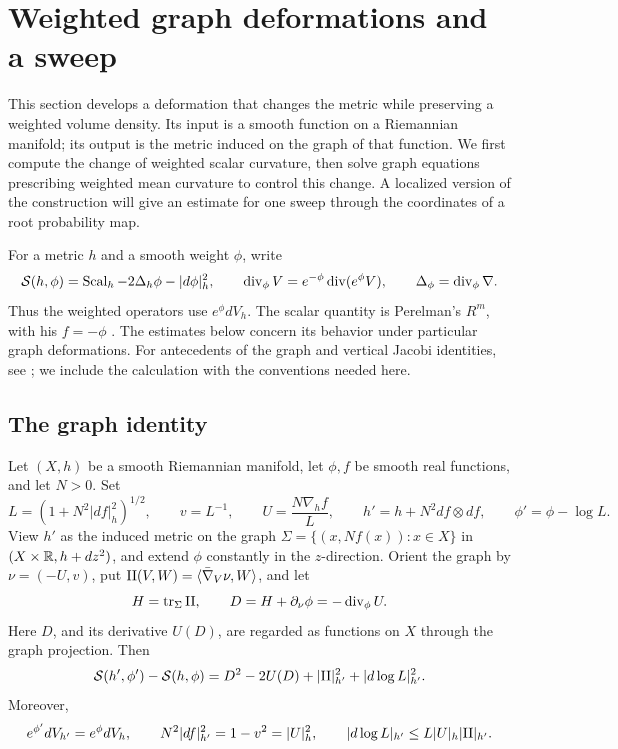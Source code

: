 \section{Weighted graph deformations and a sweep}
\label{sec:graphs}

This section develops a deformation that changes the metric while
preserving a weighted volume density.  Its input is a smooth function
on a Riemannian manifold; its output is the metric induced on the
graph of that function.  We first compute the change of weighted
scalar curvature, then solve graph equations prescribing weighted mean
curvature to control this change.  A localized version of the construction will give an
estimate for one sweep through the coordinates of a root probability
map.

For a metric \(h\) and a smooth weight \(\phi\), write
\[
 \mathcal S(h,\phi)=\operatorname{Scal}_h-2\Delta_h\phi-|d\phi|_h^2,
 \qquad
 \operatorname{div}_\phi V=e^{-\phi}\operatorname{div}(e^\phi V),
 \qquad
 \Delta_\phi=\operatorname{div}_\phi\nabla .
\]
Thus the weighted operators use \(e^\phi dV_h\).  The scalar quantity
is Perelman's \(R^m\), with his \(f=-\phi\)
\cite[Section~1.3]{Perelman2002}.  The estimates below concern its
behavior under particular graph deformations.  For antecedents of
the graph and vertical Jacobi identities, see
\cite[Proposition~4.1]{OpenAIScalarInessentiality2026}; we include the
calculation with the conventions needed here.

\subsection{The graph identity}

\begin{lemma}
\label{lem:graph-identity}
Let \((X,h)\) be a smooth Riemannian manifold, let \(\phi,f\) be
smooth real functions, and let \(N>0\).  Set
\[
 L=(1+N^2|df|_h^2)^{1/2},\qquad v=L^{-1},\qquad
 U=\frac{N\nabla_h f}{L},\qquad
 h'=h+N^2df\otimes df,\qquad \phi'=\phi-\log L.
\]
View \(h'\) as the induced metric on the graph
\(\Sigma=\{(x,Nf(x)):x\in X\}\) in
\((X\times\mathbb R,h+dz^2)\), and extend \(\phi\) constantly in the
\(z\)-direction.  Orient the graph by
\(\nu=(-U,v)\), put
\(\mathrm{II}(V,W)=\langle\bar\nabla_V\nu,W\rangle\), and let
\[
 H=\operatorname{tr}_\Sigma\mathrm{II},\qquad
 D=H+\partial_\nu\phi=-\operatorname{div}_\phi U .
\]
Here \(D\), and its derivative \(U(D)\), are regarded as functions on
\(X\) through the graph projection.  Then
\begin{equation}
 \mathcal S(h',\phi')-\mathcal S(h,\phi)
 =D^2-2U(D)+|\mathrm{II}|_{h'}^2+|d\log L|_{h'}^2.
 \label{eq:graph-identity}
\end{equation}
Moreover,
\begin{equation}
 e^{\phi'}dV_{h'}=e^\phi dV_h,\qquad
 N^2|df|_{h'}^2=1-v^2=|U|_h^2,\qquad
 |d\log L|_{h'}\le L|U|_h|\mathrm{II}|_{h'} .
 \label{eq:graph-basic-bounds}
\end{equation}
\end{lemma}

